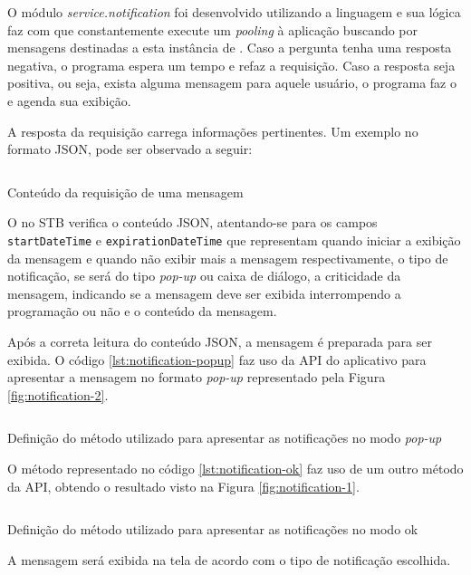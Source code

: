 O módulo \textit{service.notification} foi desenvolvido utilizando a linguagem
\python[] e sua lógica faz com que constantemente execute um \textit{pooling} à
aplicação buscando por mensagens destinadas a esta instância de \software. Caso
a pergunta tenha uma resposta negativa, o programa espera um tempo e refaz a
requisição. Caso a resposta seja positiva, ou seja, exista alguma mensagem para
aquele usuário, o programa faz o \download[] e agenda sua exibição. 

A resposta da requisição carrega informações pertinentes. Um exemplo no formato
JSON, pode ser observado a seguir:

\begin{listing}[ht!]
\inputminted{json}{codigos/message.json}
\caption{Conteúdo da requisição de uma mensagem}
\label{lst:notification-json}
\end{listing}

O \software[] no STB verifica o conteúdo JSON, atentando-se para os campos 
\texttt{startDateTime} e \texttt{expirationDateTime} que representam quando 
iniciar a exibição da mensagem e quando não exibir mais a mensagem 
respectivamente, o tipo de notificação, se será do tipo \textit{pop-up} ou
caixa de diálogo, a criticidade da mensagem, indicando se a mensagem deve ser
exibida interrompendo a programação ou não e o conteúdo da mensagem. 

Após a correta leitura do conteúdo JSON, a mensagem é preparada para ser 
exibida. O código \ref{lst:notification-popup} faz uso da API do aplicativo
\xbmc[] para apresentar a mensagem no formato \textit{pop-up} representado pela
Figura \vref{fig:notification-2}.

\begin{listing}[ht!]
\inputminted{python}{codigos/notification-popup.py}
\caption{Definição do método utilizado para apresentar as notificações no modo
\textit{pop-up}}
\label{lst:notification-popup}
\end{listing}

O método representado no código \ref{lst:notification-ok} faz uso de um outro 
método da API, obtendo o resultado visto na Figura \vref{fig:notification-1}.

\begin{listing}[ht!]
\inputminted{python}{codigos/notification-ok.py}
\caption{Definição do método utilizado para apresentar as notificações no modo
ok}
\label{lst:notification-ok}
\end{listing}

A mensagem será exibida na tela de acordo com o tipo de notificação escolhida. 

